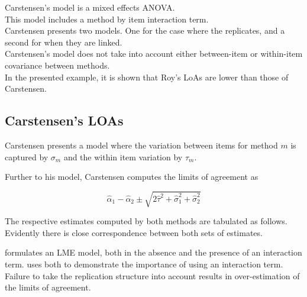 \documentclass[12pt, a4paper]{report}
\theoremstyle{plain}
\theoremstyle{definition}
\theoremstyle{remark}
\begin{document}
	Carstensen's model is a mixed effects ANOVA.\\
	
	This model includes a method by item interaction term.\\
	
	Carstensen presents two models. One for the case where the replicates, and a second for when they are linked.\\
	Carstensen's model does not take into account either between-item or within-item covariance between methods.\\
	In the presented example, it is shown that Roy's LoAs are lower than those of Carstensen.
	
	
	
	
	
	
	
	
	\subsection{Carstensen's LOAs}
	
	
	Carstensen presents a model where the variation between items for
	method $m$ is captured by $\sigma_m$ and the within item variation
	by $\tau_m$.
	
	Further to his model, Carstensen computes the limits of agreement
	as
	
	\[
	\hat{\alpha}_1 - \hat{\alpha}_2 \pm \sqrt{2 \hat{\tau}^2 +
		\hat{\sigma}^2_1 + \hat{\sigma}^2_2}
	\]
	
	The respective estimates computed by both methods are tabulated as follows. Evidently there is close correspondence between both sets of estimates.
	
	\citet{BXC2008} formulates an LME model, both in the absence and the presence of an interaction term.\citet{bxc} uses both to demonstrate the importance of using an interaction term. Failure to take the replication structure into
	account results in over-estimation of the limits of agreement. 
	
	
	
	
	
	
	
	
	
	
	
	\newpage
	
	
	
\end{document}
